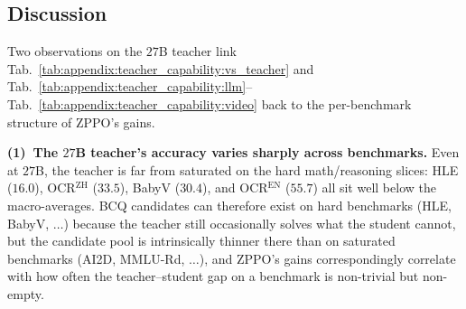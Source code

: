 \begin{table}[!htbp]
    \centering
    \caption{Per-benchmark accuracy on the $5$ Video benchmarks: ZPPO students at four scales vs.\ the $27$B teacher. The teacher--student gap is the narrowest of the three benchmark families (e.g.\ at $9$B, every Video benchmark sits within a few pp of the $27$B teacher, with the largest residual on VMME at $5.9$\,pp), even though the student is trained as a VLM and Video is purely a generalization eval.}
    \label{tab:appendix:teacher_capability:video}
\end{table}

\subsection{Discussion}
\label{sec:appendix:teacher_capability:disc}

Two observations on the $27$B teacher link Tab.~\ref{tab:appendix:teacher_capability:vs_teacher} and Tab.~\ref{tab:appendix:teacher_capability:llm}--Tab.~\ref{tab:appendix:teacher_capability:video} back to the per-benchmark structure of ZPPO's gains.

\textbf{(1)~The $27$B teacher's accuracy varies sharply across benchmarks.} Even at $27$B, the teacher is far from saturated on the hard math/reasoning slices: HLE ($16.0$), OCR$^\text{ZH}$ ($33.5$), BabyV ($30.4$), and OCR$^\text{EN}$ ($55.7$) all sit well below the macro-averages. BCQ candidates can therefore exist on hard benchmarks (HLE, BabyV, $\dots$) because the teacher still occasionally solves what the student cannot, but the candidate pool is intrinsically thinner there than on saturated benchmarks (AI2D, MMLU-Rd, $\dots$), and ZPPO's gains correspondingly correlate with how often the teacher--student gap on a benchmark is non-trivial but non-empty.

